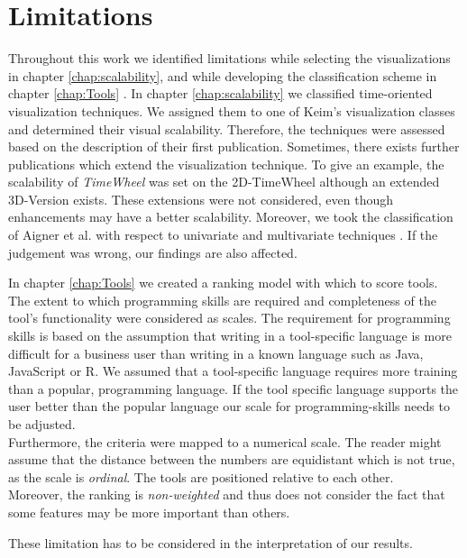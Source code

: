 \section{Limitations} \label{limitations}
Throughout this work we identified limitations while selecting the visualizations in chapter \ref{chap:scalability}, and while developing the classification scheme in chapter \ref{chap:Tools} .
In chapter \ref{chap:scalability} we classified time-oriented visualization techniques. We assigned them to one of Keim's visualization classes and determined their visual scalability. Therefore, the techniques were assessed based on the description of their first publication. Sometimes, there exists further publications which extend the visualization technique. To give an example, the scalability of \textit{TimeWheel} was set on the 2D-TimeWheel although an extended 3D-Version exists. These extensions were not considered, even though enhancements may have a better scalability. 
Moreover, we took the classification of Aigner et al. with respect to univariate and multivariate techniques  \cite{Aigner2011}. If the judgement was wrong, our findings are also affected. 
\par
In chapter \ref{chap:Tools} we created a ranking model with which to score tools. The extent to which programming skills are required and completeness of the tool's functionality were considered as scales. The requirement for programming skills is based on the assumption that writing in a tool-specific language is more difficult for a business user than writing in a known language such as Java, JavaScript or R. We assumed that a tool-specific language requires more training than a popular, programming language. If the tool specific language supports the user better than the popular language our scale for programming-skills needs to be adjusted. \\ Furthermore, the criteria were mapped to a numerical scale. The reader might assume that the distance between the numbers are equidistant which is not true, as the scale is \textit{ordinal}. The tools are positioned relative to each other. \\ Moreover, the ranking is \textit{non-weighted} and thus does not consider the fact that some features may be more important than others. 
\par
These limitation has to be considered in the interpretation of our results. 

